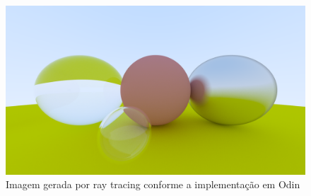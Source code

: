 \documentclass[english, 
               brazil, 
               bsc] %
               {dcomp-abntex2}
\begin{document}
\begin{landscape}
\begin{figure}[H]
        \caption{\label{imagem-raytrace} \small Imagem gerada por ray tracing conforme a implementação em Odin}
        \begin{center}
            \includegraphics[scale=0.50]{./Imagens/ray_tracer.png}
        \end{center}
\end{figure}
\end{landscape}




% 


% 
% 
% 
% 







\postextual


\renewcommand{\chapnumfont}{\chaptitlefont}
\renewcommand{\afterchapternum}{}
% 
% 
\end{document}
